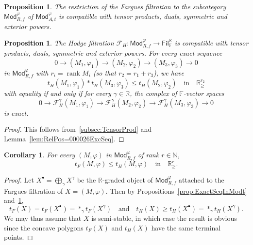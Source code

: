 \documentclass[11pt]{article}
\newtheorem{prop}[theo]{Proposition}
\newtheorem{coro}[theo]{Corollary}
\theoremstyle{definition}
\numberwithin{equation}{section}
\numberwithin{figure}{section}
\numberwithin{table}{section}
\newcommand{\Mod}{\mathsf{Mod}}
\newcommand{\Fil}{\mathsf{Fil}}
\DeclareMathOperator{\rank}{rank}
\begin{document}
\begin{prop}\label{prop:FarguesonO_Kflattensor}
The restriction of the Fargues filtration to the subcategory $\Mod_{R,f}^{\varphi}$ of $\Mod_{A,t}^{\varphi}$ is compatible with tensor products, duals, symmetric and exterior powers.
\end{prop}

\begin{prop}\label{prop:HodgeonO_Kflat}
The Hodge filtration $\mathcal{F}_{H}:\Mod_{R,f}^{\varphi}\rightarrow\Fil_{\mathbb{F}}^{\mathbb{R}}$ is compatible with tensor products, duals, symmetric and exterior powers. For every exact sequence
\[
0\rightarrow(M_{1},\varphi_{1})\rightarrow(M_{2},\varphi_{2})\rightarrow(M_{3},\varphi_{3})\rightarrow0
\]
in $\Mod_{R,f}^{\varphi}$ with $r_{i}=\rank M_{i}$ (so that $r_{2}=r_{1}+r_{3}$), we have
\[
t_{H}(M_{1},\varphi_{1})\ast t_{H}(M_{3},\varphi_{3})\leq t_{H}(M_{2},\varphi_{2})\quad\text{in}\quad\mathbb{R}_{\geq}^{r_{2}}
\]
with equality if and only if for every $\gamma\in\mathbb{R}$, the complex of $\mathbb{F}$-vector spaces
\[
0\rightarrow\mathcal{F}_{H}^{\gamma}(M_{1},\varphi_{1})\rightarrow\mathcal{F}_{H}^{\gamma}(M_{2},\varphi_{2})\rightarrow\mathcal{F}_{H}^{\gamma}(M_{3},\varphi_{3})\rightarrow0
\]
is exact.
\end{prop}

\begin{proof}
This follows from~\ref{subsec:TensorProd} and Lemma~\ref{lem:RelPos=000026ExcSeq}.
\end{proof}

\begin{coro}\label{cor:tF=000026tH4M1}
For every $(M,\varphi)$ in $\Mod_{R,f}^{\varphi}$ of rank $r\in\mathbb{N}$,
\[
t_{F}(M,\varphi)\leq t_{H}(M,\varphi)\quad\text{in}\quad\mathbb{R}_{\geq}^{r}.
\]
\end{coro}

\begin{proof}
Let $X^{\bullet}=\bigoplus_{\gamma}X^{\gamma}$ be the $\mathbb{R}$-graded object of $\Mod_{R,f}^{\varphi}$ attached to the Fargues filtration of $X=(M,\varphi)$. Then by Propositions~\ref{prop:ExactSeqInModt} and~\ref{prop:HodgeonO_Kflat},
\[
t_{F}(X)=t_{F}(X^{\bullet})=\ast_{\gamma}t_{F}(X^{\gamma})\quad\text{and}\quad t_{H}(X)\geq t_{H}(X^{\bullet})=\ast_{\gamma}t_{H}(X^{\gamma}).
\]
We may thus assume that $X$ is semi-stable, in which case the result is obvious since the concave polygons $t_{F}(X)$ and $t_{H}(X)$ have the same terminal points.
\end{proof}
\end{document}
